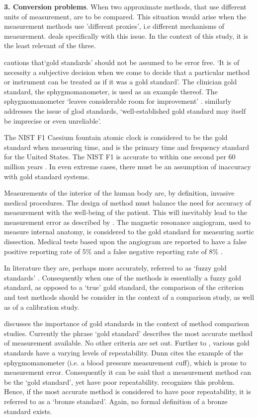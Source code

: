 \documentclass[12pt, a4paper]{report}
\theoremstyle{plain}
\theoremstyle{definition}
\theoremstyle{remark}
\begin{document}
\bigskip \textbf{3. Conversion problems}. When two approximate methods, that use different units of measurement, are to be
	compared. This situation would arise when the measurement methods	use 'different proxies', i.e different mechanisms of measurement.
	\citet{lewis} deals specifically with this issue. In the context of this study, it is the least relevant of the three.
	
\citet[p.47]{DunnSEME} cautions that`gold standards' should not be
	assumed to be error free. `It is of necessity a subjective decision when we come to decide that a particular method or
	instrument can be treated as if it was a gold standard'. The clinician gold standard, the sphygmomanometer, is used as an example thereof. The sphygmomanometer `leaves considerable room for improvement' \citep{DunnSEME}. \citet{pizzi} similarly addresses the issue of glod standards, `well-established gold standard may itself be imprecise or even unreliable'.
	
The NIST F1 Caesium fountain atomic clock is considered to be the gold standard when measuring time, and is the primary time and frequency standard for the United States. The NIST F1 is accurate	to within one second per 60 million years \citep{NIST}. In even extreme cases, there must be an assumption of inaccuracy with gold standard systems.

	
	Measurements of the interior of the human body are, by definition,
	invasive medical procedures. The design of method must balance the
	need for accuracy of measurement with the well-being of the
	patient. This will inevitably lead to the measurement error as
	described by \citet{DunnSEME}. The magnetic resonance angiogram,
	used to measure internal anatomy, is considered to the gold
	standard for measuring aortic dissection. Medical tests based upon
	the angiogram are reported to have a false positive reporting rate
	of 5\% and a false negative reporting rate of 8\% \citep{ACR}.
		

	In literature they are, perhaps more accurately, referred to as `fuzzy gold standards' \citep{phelps}. Consequently when one of the methods is
	essentially a fuzzy gold standard, as opposed to a `true' gold
	standard, the comparison of the criterion and test methods should
	be consider in the context of a comparison study, as well as of a
	calibration study.	
		

	
	
	\citet{Aroy2015} discusses the importance of gold standards in the context of method comparison studies.
	Currently the phrase `gold standard' describes the most accurate method of measurement available. No other criteria are set out. Further to \citet{DunnSEME}, various gold standards have a varying levels of repeatability. Dunn cites the example of the sphygmomanometer (i.e. a blood pressure measurement cuff), which is prone to measurement error. Consequently it can be said that a measurement method can be the `gold standard', yet have poor repeatability. \citet{DunnSEME} recognizes this problem. Hence, if the most accurate method is considered to have poor repeatability, it is referred to as a `bronze standard'.  Again, no formal definition of a bronze standard exists.
	
\end{document}
